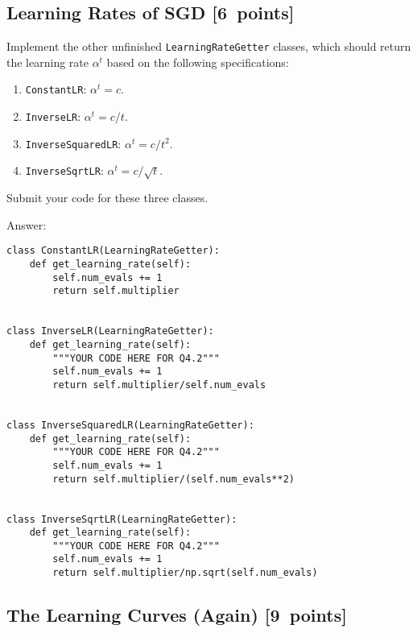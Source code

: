 \documentclass{article}
\newcommand{\blu}[1]{{\textcolor{blu}{#1}}}
\newenvironment{answer}{\par\begingroup\color{gre}Answer: }{\endgroup}
\let\ask\blu
\newcommand\pts[1]{\textcolor{pointscolour}{[#1~points]}}
\begin{document}
\subsection{Learning Rates of SGD \pts{6}}

Implement the other unfinished \texttt{LearningRateGetter} classes, which should return the learning rate $\alpha^t$ based on the following
specifications:
\begin{enumerate}
	\item \texttt{ConstantLR}: $\alpha^t = c$.
	\item \texttt{InverseLR}: $\alpha^t = c/t$.
	\item \texttt{InverseSquaredLR}: $\alpha^t = c/t^2$.
	\item \texttt{InverseSqrtLR}: $\alpha^t = c/\sqrt{t}$.
\end{enumerate}
\ask{Submit your code for these three classes.}
\begin{answer}
    \begin{verbatim}
class ConstantLR(LearningRateGetter):
    def get_learning_rate(self):
        self.num_evals += 1
        return self.multiplier


class InverseLR(LearningRateGetter):
    def get_learning_rate(self):
        """YOUR CODE HERE FOR Q4.2"""
        self.num_evals += 1
        return self.multiplier/self.num_evals


class InverseSquaredLR(LearningRateGetter):
    def get_learning_rate(self):
        """YOUR CODE HERE FOR Q4.2"""
        self.num_evals += 1
        return self.multiplier/(self.num_evals**2)


class InverseSqrtLR(LearningRateGetter):
    def get_learning_rate(self):
        """YOUR CODE HERE FOR Q4.2"""
        self.num_evals += 1
        return self.multiplier/np.sqrt(self.num_evals)
    \end{verbatim}
\end{answer}
\newpage


\subsection{The Learning Curves (Again) \pts{9}}
\end{document}
